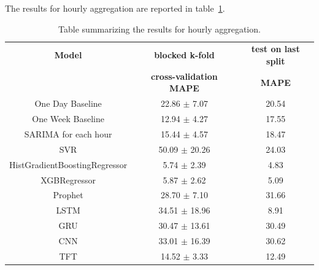 The results for hourly aggregation are reported in table~\ref{tab:demandhourlyresults}.

\begin{table}[H]
\centering
\begin{tabular}{|c|c|c|}
\hline
\textbf{Model} & \textbf{blocked k-fold} & \textbf{test on last split}\\
 & \textbf{cross-validation MAPE} & \textbf{MAPE}\\
\hline
One Day Baseline & 22.86 $\pm$ 7.07 & 20.54\\
\hline
One Week Baseline & 12.94 $\pm$ 4.27 & 17.55\\
\hline
SARIMA for each hour & 15.44 $\pm$ 4.57 & 18.47\\
\hline
SVR & 50.09 $\pm$ 20.26 & 24.03\\
\hline
HistGradientBoostingRegressor & 5.74 $\pm$ 2.39 & 4.83\\
\hline
XGBRegressor & 5.87 $\pm$ 2.62 & 5.09\\
\hline
Prophet & 28.70 $\pm$ 7.10 & 31.66\\
\hline
LSTM & 34.51 $\pm$ 18.96 & 8.91\\
\hline
GRU & 30.47 $\pm$ 13.61 & 30.49\\
\hline
CNN & 33.01 $\pm$ 16.39 & 30.62\\
\hline
TFT & 14.52 $\pm$ 3.33 & 12.49\\
\hline
\end{tabular}
\caption{Table summarizing the results for hourly aggregation.}
\label{tab:demandhourlyresults}
\end{table}


